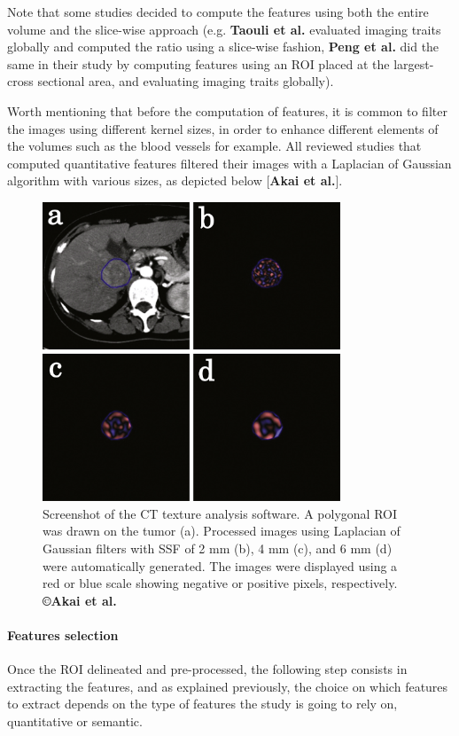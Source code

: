 \documentclass[]{article}
\let\oldparagraph\paragraph
\renewcommand{\paragraph}[1]{\oldparagraph{#1}\mbox{}}
\begin{document}
Note that some studies decided to compute the features using both the
entire volume and the slice-wise approach (e.g. \textbf{Taouli et al.}
evaluated imaging traits globally and computed the ratio using a
slice-wise fashion, \textbf{Peng et al.} did the same in their study by
computing features using an ROI placed at the largest-cross sectional
area, and evaluating imaging traits globally).

Worth mentioning that before the computation of features, it is common
to filter the images using different kernel sizes, in order to enhance
different elements of the volumes such as the blood vessels for example.
All reviewed studies that computed quantitative features filtered their
images with a Laplacian of Gaussian algorithm with various sizes, as
depicted below {[}\textbf{Akai et al.}{]}.

\begin{figure}[ht!]
\centering
\includegraphics[width=3.50110in,height=3.51334in]{./images/image15.png}
\caption{ Screenshot of the CT texture analysis software. A polygonal ROI was
drawn on the tumor (a). Processed images using Laplacian of Gaussian
filters with SSF of 2 mm (b), 4 mm (c), and 6 mm (d) were automatically
generated. The images were displayed using a red or blue scale showing
negative or positive pixels, respectively. \textbf{©Akai et al.}}
\end{figure}

\paragraph{Features selection}\label{features-selection-1}

Once the ROI delineated and pre-processed, the following step consists
in extracting the features, and as explained previously, the choice on
which features to extract depends on the type of features the study is
going to rely on, quantitative or semantic.
\end{document}
